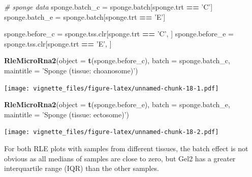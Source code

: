 \documentclass[]{book}
\newenvironment{Shaded}{\begin{snugshade}}{\end{snugshade}}
\newcommand{\KeywordTok}[1]{\textcolor[rgb]{0.13,0.29,0.53}{\textbf{#1}}}
\newcommand{\DataTypeTok}[1]{\textcolor[rgb]{0.13,0.29,0.53}{#1}}
\newcommand{\StringTok}[1]{\textcolor[rgb]{0.31,0.60,0.02}{#1}}
\newcommand{\CommentTok}[1]{\textcolor[rgb]{0.56,0.35,0.01}{\textit{#1}}}
\newcommand{\OperatorTok}[1]{\textcolor[rgb]{0.81,0.36,0.00}{\textbf{#1}}}
\newcommand{\NormalTok}[1]{#1}
\begin{document}
\begin{Shaded}
\begin{Highlighting}[]
\CommentTok{# sponge data}
\NormalTok{sponge.batch_c =}\StringTok{ }\NormalTok{sponge.batch[sponge.trt }\OperatorTok{==}\StringTok{ 'C'}\NormalTok{]}
\NormalTok{sponge.batch_e =}\StringTok{ }\NormalTok{sponge.batch[sponge.trt }\OperatorTok{==}\StringTok{ 'E'}\NormalTok{] }

\NormalTok{sponge.before_c =}\StringTok{ }\NormalTok{sponge.tss.clr[sponge.trt }\OperatorTok{==}\StringTok{ 'C'}\NormalTok{, ]}
\NormalTok{sponge.before_e =}\StringTok{ }\NormalTok{sponge.tss.clr[sponge.trt }\OperatorTok{==}\StringTok{ 'E'}\NormalTok{, ] }


\KeywordTok{RleMicroRna2}\NormalTok{(}\DataTypeTok{object =} \KeywordTok{t}\NormalTok{(sponge.before_c), }\DataTypeTok{batch =}\NormalTok{ sponge.batch_c, }
             \DataTypeTok{maintitle =} \StringTok{'Sponge (tissue: choanosome)'}\NormalTok{)}
\end{Highlighting}
\end{Shaded}

\texttt{[image: vignette\_files/figure-latex/unnamed-chunk-18-1.pdf]}

\begin{Shaded}
\begin{Highlighting}[]
\KeywordTok{RleMicroRna2}\NormalTok{(}\DataTypeTok{object =} \KeywordTok{t}\NormalTok{(sponge.before_e), }\DataTypeTok{batch =}\NormalTok{ sponge.batch_e, }
             \DataTypeTok{maintitle =} \StringTok{'Sponge (tissue: ectosome)'}\NormalTok{)}
\end{Highlighting}
\end{Shaded}

\texttt{[image: vignette\_files/figure-latex/unnamed-chunk-18-2.pdf]}

For both RLE plots with samples from different tissues, the batch effect
is not obvious as all medians of samples are close to zero, but Gel2 has
a greater interquartile range (IQR) than the other samples.
\end{document}
